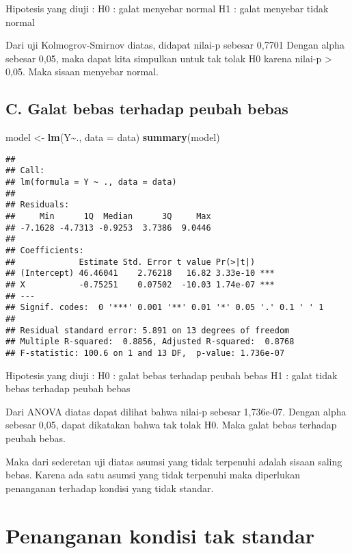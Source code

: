 \documentclass[
]{article}
\newenvironment{Shaded}{\begin{snugshade}}{\end{snugshade}}
\newcommand{\AttributeTok}[1]{\textcolor[rgb]{0.13,0.29,0.53}{#1}}
\newcommand{\FunctionTok}[1]{\textcolor[rgb]{0.13,0.29,0.53}{\textbf{#1}}}
\newcommand{\NormalTok}[1]{#1}
\newcommand{\OtherTok}[1]{\textcolor[rgb]{0.56,0.35,0.01}{#1}}
\newcommand{\SpecialCharTok}[1]{\textcolor[rgb]{0.81,0.36,0.00}{\textbf{#1}}}
\begin{document}
Hipotesis yang diuji : H0 : galat menyebar normal H1 : galat menyebar
tidak normal

Dari uji Kolmogrov-Smirnov diatas, didapat nilai-p sebesar 0,7701 Dengan
alpha sebesar 0,05, maka dapat kita simpulkan untuk tak tolak H0 karena
nilai-p \textgreater{} 0,05. Maka sisaan menyebar normal.

\hypertarget{c.-galat-bebas-terhadap-peubah-bebas}{%
\subsection{C. Galat bebas terhadap peubah
bebas}\label{c.-galat-bebas-terhadap-peubah-bebas}}

\begin{Shaded}
\begin{Highlighting}[]
\NormalTok{model }\OtherTok{\textless{}{-}} \FunctionTok{lm}\NormalTok{(Y}\SpecialCharTok{\textasciitilde{}}\NormalTok{., }\AttributeTok{data =}\NormalTok{ data)}
\FunctionTok{summary}\NormalTok{(model)}
\end{Highlighting}
\end{Shaded}

\begin{verbatim}
## 
## Call:
## lm(formula = Y ~ ., data = data)
## 
## Residuals:
##     Min      1Q  Median      3Q     Max 
## -7.1628 -4.7313 -0.9253  3.7386  9.0446 
## 
## Coefficients:
##             Estimate Std. Error t value Pr(>|t|)    
## (Intercept) 46.46041    2.76218   16.82 3.33e-10 ***
## X           -0.75251    0.07502  -10.03 1.74e-07 ***
## ---
## Signif. codes:  0 '***' 0.001 '**' 0.01 '*' 0.05 '.' 0.1 ' ' 1
## 
## Residual standard error: 5.891 on 13 degrees of freedom
## Multiple R-squared:  0.8856, Adjusted R-squared:  0.8768 
## F-statistic: 100.6 on 1 and 13 DF,  p-value: 1.736e-07
\end{verbatim}

Hipotesis yang diuji : H0 : galat bebas terhadap peubah bebas H1 : galat
tidak bebas terhadap peubah bebas

Dari ANOVA diatas dapat dilihat bahwa nilai-p sebesar 1,736e-07. Dengan
alpha sebesar 0,05, dapat dikatakan bahwa tak tolak H0. Maka galat bebas
terhadap peubah bebas.

Maka dari sederetan uji diatas asumsi yang tidak terpenuhi adalah sisaan
saling bebas. Karena ada satu asumsi yang tidak terpenuhi maka
diperlukan penanganan terhadap kondisi yang tidak standar.

\hypertarget{penanganan-kondisi-tak-standar}{%
\section{Penanganan kondisi tak
standar}\label{penanganan-kondisi-tak-standar}}
\end{document}
